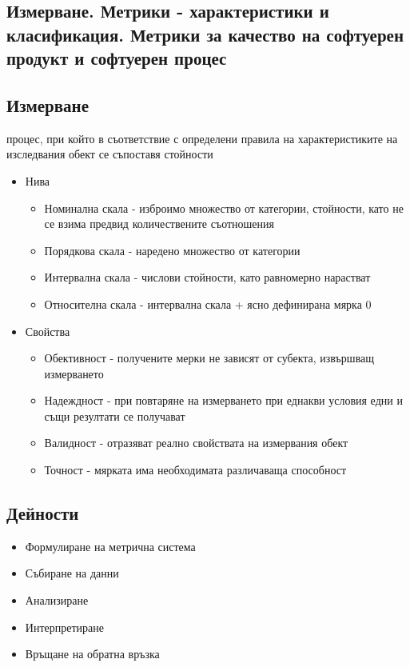 \documentclass[fleqn,12pt]{article}
\begin{document}
\begin{flushleft}
\section{Измерване. Метрики - характеристики и класификация. Метрики за качество на софтуерен продукт и софтуерен процес}
    \subsection{Измерване}
    процес, при който в съответствие с определени правила на характеристиките на изследвания обект се съпоставя стойности
        \begin{itemize}
            \item Нива
                \begin{itemize}
                    \item Номинална скала - изброимо множество от категории, стойности, като не се взима предвид количествените съотношения
                    \item Порядкова скала - наредено множество от категории
                    \item Интервална скала - числови стойности, като равномерно нарастват
                    \item Относителна скала - интервална скала + ясно дефинирана мярка 0
                \end{itemize}
            \item Свойства
                \begin{itemize}
                    \item Обективност - получените мерки не зависят от субекта, извършващ измерването
                    \item Надеждност - при повтаряне на измерването при еднакви условия едни и същи резултати се получават
                    \item Валидност - отразяват реално свойствата на измервания обект
                    \item Точност - мярката има необходимата различаваща способност
                \end{itemize}
        \end{itemize}
  \subsection{Дейности}
    \begin{itemize}
        \item Формулиране на метрична система
        \item Събиране на данни
        \item Анализиране
        \item Интерпретиране
        \item Връщане на обратна връзка
    \end{itemize}

\end{flushleft}
\end{document}
